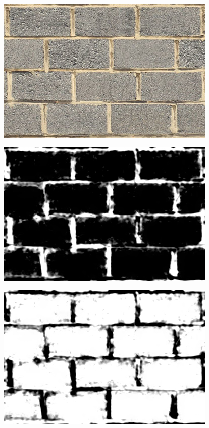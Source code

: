 \documentclass[a4paper, 13pt]{extarticle}
\begin{document}
{	 \begin{figure}[h]
	 	\begin{minipage}{.3\textwidth}
	 		\centering
	 		\includegraphics[width=0.6\linewidth]{intructions/Brick002.png}
	 		\label{fig:test43}
	 	\end{minipage}
	 	\begin{minipage}{.3\textwidth}
	 		\centering
	 		\includegraphics[width=0.6\linewidth]{intructions/Brick002_height_invert.png}
	 		\label{fig:test44}
	 	\end{minipage}
 		\begin{minipage}{.3\textwidth}
 			\centering
 			\includegraphics[width=0.6\linewidth]{intructions/Brick002_height.png}
 			\label{fig:test45}
 		\end{minipage}
	 \end{figure}
	
}
\end{document}
